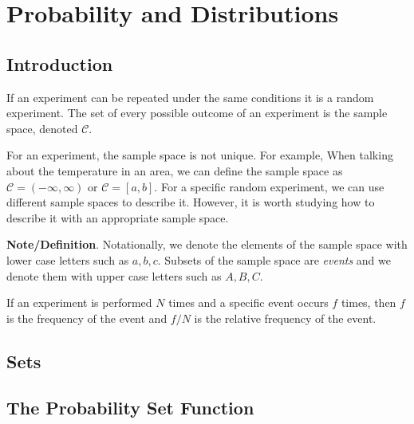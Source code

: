\chapter{Probability and Distributions}

\section{Introduction}
\begin{definition}{}{}
    If an experiment can be repeated under the same conditions 
    it is a random experiment. The set of every possible outcome 
    of an experiment is the sample space, denoted $\mathcal{C}$.
\end{definition}
\begin{remark}
    For an experiment, the sample space is not unique.
    For example, When talking about the temperature in an area, 
    we can define the sample space as $\mathcal{C}=(-\infty,\infty)$ or $\mathcal{C}=[a,b]$.
    For a specific random experiment, we can use different sample spaces to describe it. 
    However, it is worth studying how to describe it with an appropriate sample space.
\end{remark}
\par
\textbf{Note/Definition}.
Notationally, we denote the elements of the sample space with
lower case letters such as $a,b,c$. Subsets of the sample space are \textit{events}
and we denote them with upper case letters such as $A,B,C$.

\begin{definition}{}{}
    If an experiment is performed $N$ times and a specific event occurs $f$ times,
    then $f$ is the frequency of the event and $f/N$ is the relative frequency of the event.
\end{definition}


\section{Sets}

\section{The Probability Set Function}

